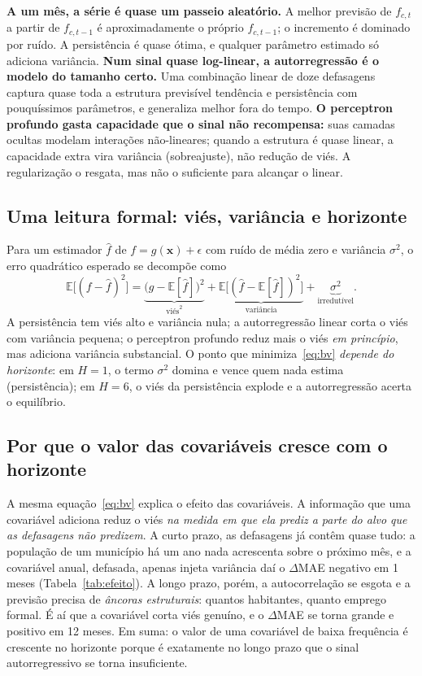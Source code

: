 \documentclass[12pt,a4paper,oneside]{article}
\begin{document}
\textbf{A um mês, a série é quase um passeio aleatório.} A melhor previsão
de $f_{c,t}$ a partir de $f_{c,t-1}$ é aproximadamente o próprio
$f_{c,t-1}$; o incremento é dominado por ruído. A persistência é quase
ótima, e qualquer parâmetro estimado só adiciona variância.
\textbf{Num sinal quase log-linear, a autorregressão é o modelo do
tamanho certo.} Uma combinação linear de doze defasagens captura quase
toda a estrutura previsível \textemdash{} tendência e persistência
\textemdash{} com pouquíssimos parâmetros, e generaliza melhor fora do
tempo. \textbf{O perceptron profundo gasta capacidade que o sinal não
recompensa:} suas camadas ocultas modelam interações não-lineares; quando
a estrutura é quase linear, a capacidade extra vira variância
(sobreajuste), não redução de viés. A regularização o resgata, mas não o
suficiente para alcançar o linear.

\subsection{Uma leitura formal: viés, variância e horizonte}

Para um estimador $\widehat{f}$ de $f=g(\bm x)+\epsilon$ com ruído de média
zero e variância $\sigma^2$, o erro quadrático esperado se decompõe como
\begin{equation}
\mathbb{E}\bigl[(f-\widehat{f})^2\bigr]
= \underbrace{\bigl(g-\mathbb{E}[\widehat{f}]\bigr)^2}_{\text{viés}^2}
+ \underbrace{\mathbb{E}\bigl[(\widehat{f}-\mathbb{E}[\widehat{f}])^2\bigr]}_{\text{variância}}
+ \underbrace{\sigma^2}_{\text{irredutível}} .
\label{eq:bv}
\end{equation}
A persistência tem viés alto e variância nula; a autorregressão linear
corta o viés com variância pequena; o perceptron profundo reduz mais o
viés \emph{em princípio}, mas adiciona variância substancial. O ponto que
minimiza~\eqref{eq:bv} \emph{depende do horizonte}: em $H=1$, o termo
$\sigma^2$ domina e vence quem nada estima (persistência); em $H=6$, o viés
da persistência explode e a autorregressão acerta o equilíbrio.

\subsection{Por que o valor das covariáveis cresce com o horizonte}

A mesma equação~\eqref{eq:bv} explica o efeito das covariáveis. A
informação que uma covariável adiciona reduz o viés \emph{na medida em que
ela prediz a parte do alvo que as defasagens não predizem}. A curto prazo,
as defasagens já contêm quase tudo: a população de um município há um ano
nada acrescenta sobre o próximo mês, e a covariável anual, defasada, apenas
injeta variância \textemdash{} daí o $\Delta$MAE negativo em
1 meses (Tabela~\ref{tab:efeito}). A longo prazo, porém, a
autocorrelação se esgota e a previsão precisa de \emph{âncoras
estruturais}: quantos habitantes, quanto emprego formal. É aí que a
covariável corta viés genuíno, e o $\Delta$MAE se torna grande e positivo
em 12 meses. Em suma: o valor de uma covariável de baixa frequência é
crescente no horizonte porque é exatamente no longo prazo que o sinal
autorregressivo se torna insuficiente.
\end{document}
